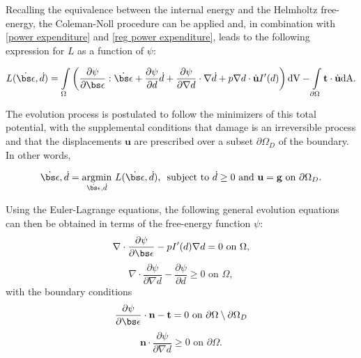 Recalling the equivalence between the internal energy and the Helmholtz free-energy, the Coleman-Noll procedure can be applied and, in combination with \eqref{power expenditure} and \eqref{reg power expenditure}, leads to the following expression for $L$ as a function of $\psi$: 

\begin{equation}
    L(\dot{\bs\epsilon},\dot{d}) = \int\limits_{\Omega} \left( \dfrac{\partial\psi}{\partial\bs\epsilon}:\dot{\bs\epsilon} + \dfrac{\partial\psi}{\partial d}\dot{d}+\dfrac{\partial\psi}{\partial \nabla d}\cdot {\nabla \dot d} + p\nabla d \cdot\dot{\textbf{u}} I'(d) \right) \text{dV} - \int\limits_{\partial \Omega} \textbf{t}\cdot\dot{\textbf{u}} \text{dA}. 
\end{equation}

The evolution process is postulated to follow the minimizers of this total potential, with the supplemental conditions that damage is an irreversible process and that the displacements $\textbf{u}$ are prescribed over a subset $\partial \Omega_D$ of the boundary. In other words, 

\begin{equation}\label{minimization principle}
    \dot{\bs\epsilon}, \dot{d} = \underset{\dot{\bs\epsilon},\dot{d}}{{\operatorname{argmin}}} \ L(\dot{\bs\epsilon}, \dot{d}) \text{,\ \   subject to } \dot{d} \ge 0 \text{ and } \textbf{u}=\textbf{g} \text{ on }\partial \Omega_D. 
\end{equation}

\noindent Using the Euler-Lagrange equations, the following general evolution equations can then be obtained in terms of the free-energy function $\psi$:
\begin{equation}\label{u_equation}
    \nabla \cdot \dfrac{\partial\psi}{\partial \bs\epsilon} - pI'(d) \nabla d = 0 \text{ on }\Omega,
\end{equation}
\begin{equation}\label{d_equation}
    \nabla \cdot \dfrac{\partial\psi}{\partial \nabla d} - \dfrac{\partial\psi}{\partial d} \ge 0 \text{ on }\Omega,
\end{equation}
with the boundary conditions
\begin{equation}\label{u_bc_helmholtz}
    \dfrac{\partial\psi}{\partial \bs\epsilon}\cdot\textbf{n} - \textbf{t} = 0 \text{ on }\partial\Omega\setminus\partial\Omega_D
\end{equation}
\begin{equation}\label{d_bc_helmholtz}
    \textbf{n} \cdot \dfrac{\partial\psi}{\partial \nabla d} \ge 0 \text{ on }\partial\Omega.
\end{equation}

